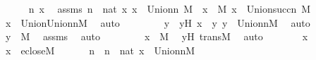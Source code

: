 \begin{isabellebody}
\ \ \ \ \isamarkupfalse%
\ n\ x\ \isamarkupfalse%
\ assms{}{\isacharcolon}{\kern0pt}\ {\isachardoublequoteopen}n\ {\isasymin}\ nat{\isachardoublequoteclose}\ {\isachardoublequoteopen}{\isasymforall}x{\isachardot}{\kern0pt}\ x\ {\isasymin}\ Union{\isacharcircum}{\kern0pt}n\ {\isacharparenleft}{\kern0pt}M{\isacharparenright}{\kern0pt}\ {\isasymlongrightarrow}\ x\ {\isasymin}\ M{\isachardoublequoteclose}\ {\isachardoublequoteopen}x\ {\isasymin}\ Union{\isacharcircum}{\kern0pt}succ{\isacharparenleft}{\kern0pt}n{\isacharparenright}{\kern0pt}\ {\isacharparenleft}{\kern0pt}M{\isacharparenright}{\kern0pt}{\isachardoublequoteclose}\ \isanewline
\ \ \ \ \isamarkupfalse%
\ \isamarkupfalse%
\ {\isachardoublequoteopen}x\ {\isasymin}\ Union{\isacharparenleft}{\kern0pt}Union{\isacharcircum}{\kern0pt}n{\isacharparenleft}{\kern0pt}M{\isacharparenright}{\kern0pt}{\isacharparenright}{\kern0pt}{\isachardoublequoteclose}\ \isamarkupfalse%
\ auto\ \isanewline
\ \ \ \ \isamarkupfalse%
\ \isamarkupfalse%
\ y\ \ yH{\isacharcolon}{\kern0pt}\ {\isachardoublequoteopen}x\ {\isasymin}\ y{\isachardoublequoteclose}\ {\isachardoublequoteopen}y\ {\isasymin}\ Union{\isacharcircum}{\kern0pt}n{\isacharparenleft}{\kern0pt}M{\isacharparenright}{\kern0pt}{\isachardoublequoteclose}\ \isamarkupfalse%
\ auto\ \isanewline
\ \ \ \ \isamarkupfalse%
\ \isamarkupfalse%
\ {\isachardoublequoteopen}y\ {\isasymin}\ M{\isachardoublequoteclose}\ \isamarkupfalse%
\ assms{}\ \isamarkupfalse%
\ auto\ \isanewline
\ \ \ \ \isamarkupfalse%
\ \isamarkupfalse%
\ {\isachardoublequoteopen}x\ {\isasymin}\ M{\isachardoublequoteclose}\ \isamarkupfalse%
\ yH\ transM\ \isamarkupfalse%
\ auto\ \isanewline
\ \ \isamarkupfalse%
\isanewline
\ \ \isamarkupfalse%
\ x\ \isamarkupfalse%
\ {\isachardoublequoteopen}x\ {\isasymin}\ eclose{\isacharparenleft}{\kern0pt}M{\isacharparenright}{\kern0pt}{\isachardoublequoteclose}\ \isanewline
\ \ \isamarkupfalse%
\ \isamarkupfalse%
\ n\ \ {\isachardoublequoteopen}n\ {\isasymin}\ nat{\isachardoublequoteclose}\ {\isachardoublequoteopen}x\ {\isasymin}\ Union{\isacharcircum}{\kern0pt}n{\isacharparenleft}{\kern0pt}M{\isacharparenright}{\kern0pt}{\isachardoublequoteclose}\ \isamarkupfalse%

\end{isabellebody}
